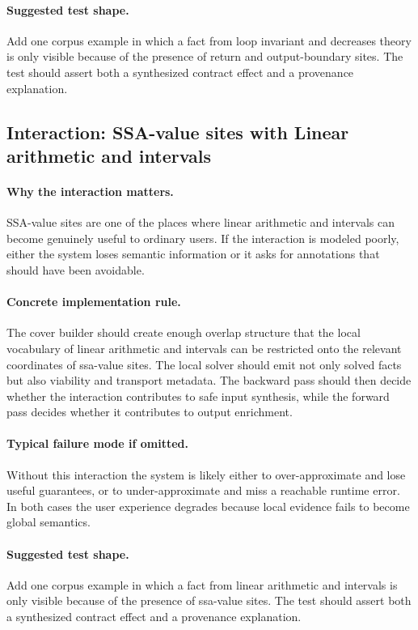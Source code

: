 \documentclass[11pt]{report}
\theoremstyle{definition}
\theoremstyle{plain}
\begin{document}
\paragraph{Suggested test shape.}
Add one corpus example in which a fact from loop invariant and decreases theory is only
visible because of the presence of return and output-boundary sites. The test should
assert both a synthesized contract effect and a provenance explanation.

\subsection{Interaction: SSA-value sites with Linear arithmetic and intervals}

\paragraph{Why the interaction matters.}
SSA-value sites are one of the places where linear arithmetic and intervals can become
genuinely useful to ordinary users. If the interaction is modeled poorly,
either the system loses semantic information or it asks for annotations that
should have been avoidable.

\paragraph{Concrete implementation rule.}
The cover builder should create enough overlap structure that the local
vocabulary of linear arithmetic and intervals can be restricted onto the relevant
coordinates of ssa-value sites. The local solver should emit not only
solved facts but also viability and transport metadata. The backward pass
should then decide whether the interaction contributes to safe input
synthesis, while the forward pass decides whether it contributes to output
enrichment.

\paragraph{Typical failure mode if omitted.}
Without this interaction the system is likely either to over-approximate and
lose useful guarantees, or to under-approximate and miss a reachable runtime
error. In both cases the user experience degrades because local evidence
fails to become global semantics.

\paragraph{Suggested test shape.}
Add one corpus example in which a fact from linear arithmetic and intervals is only
visible because of the presence of ssa-value sites. The test should
assert both a synthesized contract effect and a provenance explanation.
\end{document}

